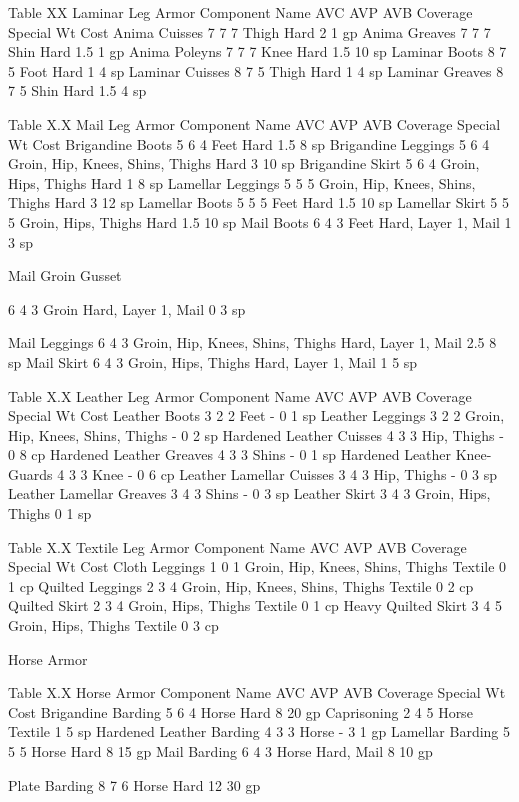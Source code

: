 \documentclass[oneside,11pt,english]{book}
\begin{document}
 
Table XX Laminar Leg Armor 
Component Name AVC AVP AVB Coverage Special Wt Cost 
Anima Cuisses 7 7 7 Thigh Hard 2 1 gp 
Anima Greaves 7 7 7 Shin Hard 1.5 1 gp 
Anima Poleyns 7 7 7 Knee Hard 1.5 10 sp 
Laminar Boots 8 7 5 Foot Hard 1 4 sp 
Laminar Cuisses 8 7 5 Thigh Hard 1 4 sp 
Laminar Greaves 8 7 5 Shin Hard 1.5 4 sp 

 
Table X.X Mail Leg Armor 
Component Name AVC AVP AVB Coverage Special Wt Cost 
Brigandine Boots 5 6 4 Feet Hard 1.5 8 sp 
Brigandine Leggings 5 6 4 Groin, Hip, Knees, Shins, Thighs Hard 3 10 sp 
Brigandine Skirt 5 6 4 Groin, Hips, Thighs Hard 1 8 sp 
Lamellar Leggings 5 5 5 Groin, Hip, Knees, Shins, Thighs Hard 3 12 sp 
Lamellar Boots 5 5 5 Feet Hard 1.5 10 sp 
Lamellar Skirt 5 5 5 Groin, Hips, Thighs Hard 1.5 10 sp 
Mail Boots 6 4 3 Feet Hard, Layer 1, Mail 1 3 sp 


Mail Groin 
Gusset 

6 4 3 Groin Hard, Layer 1, Mail 0 3 sp 

Mail Leggings 6 4 3 Groin, Hip, Knees, Shins, Thighs Hard, Layer 1, Mail 2.5 8 sp 
Mail Skirt 6 4 3 Groin, Hips, Thighs Hard, Layer 1, Mail 1 5 sp 
 
Table X.X Leather Leg Armor 
Component Name AVC AVP AVB Coverage Special Wt Cost 
Leather Boots 3 2 2 Feet - 0 1 sp 
Leather Leggings 3 2 2 Groin, Hip, Knees, Shins, Thighs - 0 2 sp 
Hardened Leather Cuisses 4 3 3 Hip, Thighs - 0 8 cp 
Hardened Leather Greaves 4 3 3 Shins - 0 1 sp 
Hardened Leather Knee-Guards 4 3 3 Knee - 0 6 cp 
Leather Lamellar Cuisses 3 4 3 Hip, Thighs - 0 3 sp 
Leather Lamellar Greaves 3 4 3 Shins - 0 3 sp 
Leather Skirt 3 4 3 Groin, Hips, Thighs 0 1 sp 

 
Table X.X Textile Leg Armor 
Component Name AVC AVP AVB Coverage Special Wt Cost 
Cloth Leggings 1 0 1 Groin, Hip, Knees, Shins, Thighs Textile 0 1 cp 
Quilted Leggings 2 3 4 Groin, Hip, Knees, Shins, Thighs Textile 0 2 cp 
Quilted Skirt 2 3 4 Groin, Hips, Thighs Textile 0 1 cp 
Heavy Quilted Skirt 3 4 5 Groin, Hips, Thighs Textile 0 3 cp 

 

Horse Armor 

 

Table X.X Horse Armor 
Component Name AVC AVP AVB Coverage Special Wt Cost 
Brigandine Barding 5 6 4 Horse Hard 8 20 gp 
Caprisoning 2 4 5 Horse Textile 1 5 sp 
Hardened Leather Barding 4 3 3 Horse - 3 1 gp 
Lamellar Barding 5 5 5 Horse Hard 8 15 gp 
Mail Barding 6 4 3 Horse Hard, Mail 8 10 gp 


Plate Barding 8 7 6 Horse Hard 12 30 gp 
\end{document}
